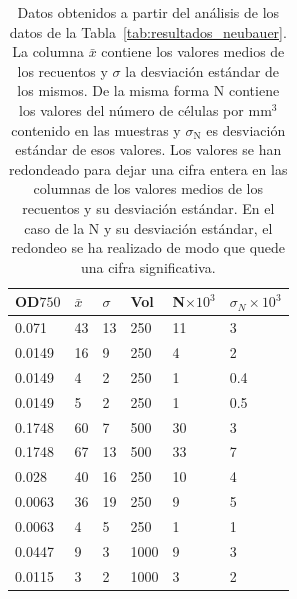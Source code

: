 
\begin{spacing}{1}

\begin{table}[H]
\renewcommand\tablename{Tabla}
\renewcommand{\arraystretch}{1.5}
\centering
    
    \setlength{\extrarowheight}{-2pt}
    \begin{tabular}{ C{2cm} C{2cm}  C{2cm} C{2cm} C{2cm} C{2cm} }
        \hline
        OD\small{$750$}	& $\bar{x}$ & $\sigma$ & Vol & N$\times {10}^{3} $ &  ${\sigma}_{N} \times {10}^{3}$\\
        \hline
        \hline

0.071	&	43	&	13	&	250	    &	11	&	3	\\
0.0149	&	16	&	9	&	250	    &	4	&	2	\\
0.0149	&	4	&	2	&	250	    &	1	&	0.4	    \\
0.0149	&	5	&	2	&	250	    &	1	&	0.5	    \\
0.1748	&	60	&	7	&	500	    &	30	&	3    \\	
0.1748	&	67	&	13	&	500	    &	33	&	7	\\
0.028	&	40	&	16	&	250	    &	10	&	4	\\
0.0063	&	36	&	19	&	250	    &	9	&	5	\\
0.0063	&	4	&	5	&	250	    &	1	&	1	\\
0.0447	&	9	&	3	&	1000	&	9	&	3	\\
0.0115	&	3	&	2	&	1000	&	3	&	2	\\

        \hline
    \end{tabular}

    \caption{\small Datos obtenidos a partir del análisis de los datos de la Tabla~\ref{tab:resultados_neubauer}. La columna $\bar{x}$ contiene los valores medios de los recuentos y $\sigma$ la desviación estándar de los mismos. De la misma forma N contiene los valores del número de células por $\mathrm{mm^{3}}$ contenido en las muestras y ${\sigma}_{\mathrm{N}}$ es desviación estándar de esos valores. Los valores se han redondeado para dejar una cifra entera en las columnas de los valores medios de los recuentos y su desviación estándar. En el caso de la N y su desviación estándar, el redondeo se ha realizado de modo que quede una cifra significativa.}
    \label{tab:analisis_neubauer}
    
\end{table}

\end{spacing}

